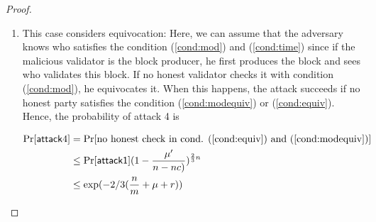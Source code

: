 \begin{proof}
\begin{enumerate}
    
    \item This case considers equivocation: Here, we can assume that the adversary knows who satisfies the condition (\ref{cond:mod}) and (\ref{cond:time}) since if the malicious validator is the block producer, he first produces the block and sees who validates this block. If no honest validator checks it with condition (\ref{cond:mod}), he equivocates it. When this happens, the attack succeeds if no honest party satisfies the condition (\ref{cond:modequiv}) or (\ref{cond:equiv}). Hence,
    the probability of attack 4 is
    
    \begin{align}
    \Pr[\mathsf{attack} 4] &= \Pr[\text{no honest check in  cond. (\ref{cond:equiv}) and (\ref{cond:modequiv})}]\nonumber \\ 
							&\leq \Pr[\mathsf{attack1}](1-\frac{\mu'}{n-nc)}) ^{\frac{2}{3}n} \nonumber\\
				            &\leq \exp({-2/3(\frac{n}{m}+\mu + r)}) \nonumber
    \end{align}
\end{enumerate}	
    
    
    





%




\end{proof}
